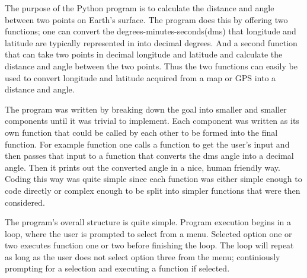 The purpose of the Python program is to calculate the distance and angle between
two points on Earth's surface. The program does this by offering two functions;
one can convert the degrees-minutes-seconds(dms) that longitude and latitude are
typically represented in into decimal degrees. And a second function that can
take two points in decimal longitude and latitude and calculate the distance and
angle between the two points. Thus the two functions can easily be used to
convert longitude and latitude acquired from a map or GPS into a distance and
angle.

The program was written by breaking down the goal into smaller and smaller
components until it was trivial to implement. Each component was written as its
own function that could be called by each other to be formed into the final
function. For example function one calls a function to get the user's input and
then passes that input to a function that converts the dms angle into a decimal
angle. Then it prints out the converted angle in a nice, human friendly
way. Coding this way was quite simple since each function was either simple
enough to code directly or complex enough to be split into simpler functions
that were then considered.

The program's overall structure is quite simple. Program execution begins in a
loop, where the user is prompted to select from a menu. Selected option one or two
executes function one or two before finishing the loop. The loop will repeat as
long as the user does not select option three from the menu; continiously
prompting for a selection and executing a function if selected.

